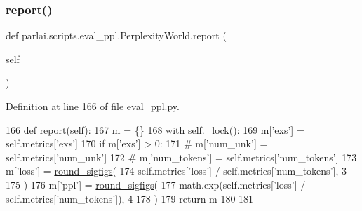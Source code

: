 \subsubsection{\texorpdfstring{report()}{report()}}
{\footnotesize\ttfamily def parlai.\+scripts.\+eval\+\_\+ppl.\+Perplexity\+World.\+report (\begin{DoxyParamCaption}\item[{}]{self }\end{DoxyParamCaption})}



Definition at line 166 of file eval\+\_\+ppl.\+py.


\begin{DoxyCode}
166     \textcolor{keyword}{def }\hyperlink{namespaceprojects_1_1convai2_1_1eval__f1_a01a47b9c08dad189837a51f085defc45}{report}(self):
167         m = \{\}
168         with self.\_lock():
169             m[\textcolor{stringliteral}{'exs'}] = self.metrics[\textcolor{stringliteral}{'exs'}]
170             \textcolor{keywordflow}{if} m[\textcolor{stringliteral}{'exs'}] > 0:
171                 \textcolor{comment}{# m['num\_unk'] = self.metrics['num\_unk']}
172                 \textcolor{comment}{# m['num\_tokens'] = self.metrics['num\_tokens']}
173                 m[\textcolor{stringliteral}{'loss'}] = \hyperlink{namespaceparlai_1_1agents_1_1legacy__agents_1_1seq2seq_1_1utils__v0_af377ec61bfc0423461e7b409ffc883b9}{round\_sigfigs}(
174                     self.metrics[\textcolor{stringliteral}{'loss'}] / self.metrics[\textcolor{stringliteral}{'num\_tokens'}], 3
175                 )
176                 m[\textcolor{stringliteral}{'ppl'}] = \hyperlink{namespaceparlai_1_1agents_1_1legacy__agents_1_1seq2seq_1_1utils__v0_af377ec61bfc0423461e7b409ffc883b9}{round\_sigfigs}(
177                     math.exp(self.metrics[\textcolor{stringliteral}{'loss'}] / self.metrics[\textcolor{stringliteral}{'num\_tokens'}]), 4
178                 )
179         \textcolor{keywordflow}{return} m
180 
181 
\end{DoxyCode}
\mbox{\label{classparlai_1_1scripts_1_1eval__ppl_1_1PerplexityWorld_a568271c275fbe3f911c1e437a04655cf}} 
